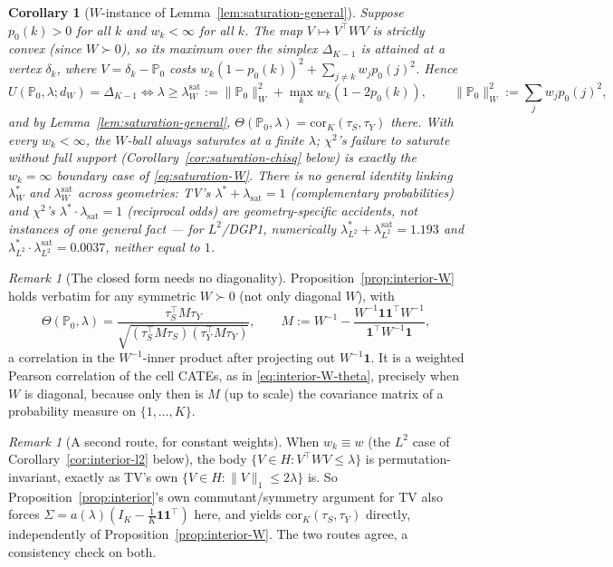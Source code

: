 \documentclass[11pt]{article}
\theoremstyle{plain}
\newtheorem{corollary}[theorem]{Corollary}
\theoremstyle{definition}
\theoremstyle{remark}
\newtheorem{remark}[theorem]{Remark}
\newcommand{\PP}{\mathbb{P}}
\newcommand{\Corr}{\mathrm{cor}}
\begin{document}
\begin{corollary}[$W$-instance of Lemma~\ref{lem:saturation-general}]\label{cor:saturation-W}
Suppose $p_0(k)>0$ for all $k$ and $w_k<\infty$ for all $k$. The map $V\mapsto V^\top WV$
is strictly convex (since $W\succ0$), so its maximum over the simplex $\Delta_{K-1}$ is
attained at a vertex $\delta_k$, where $V=\delta_k-\PP_0$ costs
$w_k(1-p_0(k))^2+\sum_{j\ne k}w_jp_0(j)^2$. Hence
\begin{equation}\label{eq:saturation-W}
    U(\PP_0,\lambda;d_W)=\Delta_{K-1}
    \iff
    \lambda\ge\lambda^{\mathrm{sat}}_W:=\|\PP_0\|_W^2+\max_kw_k(1-2p_0(k)),
    \qquad\|\PP_0\|_W^2:=\sum_jw_jp_0(j)^2,
\end{equation}
and by Lemma~\ref{lem:saturation-general}, $\Theta(\PP_0,\lambda)=\Corr_K(\tau_S,\tau_Y)$
there. With every $w_k<\infty$, the $W$-ball always saturates at a finite $\lambda$;
$\chi^2$'s failure to saturate without full support (Corollary~\ref{cor:saturation-chisq}
below) is exactly the $w_k=\infty$ boundary case of \eqref{eq:saturation-W}. There is no
general identity linking $\lambda^*_W$ and $\lambda^{\mathrm{sat}}_W$ across geometries:
TV's $\lambda^*+\lambda_{\mathrm{sat}}=1$ (complementary probabilities) and $\chi^2$'s
$\lambda^*\cdot\lambda_{\mathrm{sat}}=1$ (reciprocal odds) are geometry-specific
accidents, not instances of one general fact --- for $L^2$/DGP1, numerically
$\lambda^*_{L^2}+\lambda^{\mathrm{sat}}_{L^2}=1.193$ and
$\lambda^*_{L^2}\cdot\lambda^{\mathrm{sat}}_{L^2}=0.0037$, neither equal to $1$.
\end{corollary}

\begin{remark}[The closed form needs no diagonality]\label{rem:W-general-form}
Proposition~\ref{prop:interior-W} holds verbatim for any symmetric $W\succ0$ (not only
diagonal $W$), with
\[
    \Theta(\PP_0,\lambda)=\frac{\tau_S^\top M\tau_Y}{\sqrt{(\tau_S^\top M\tau_S)(\tau_Y^\top M\tau_Y)}},
    \qquad M:=W^{-1}-\frac{W^{-1}\mathbf1\mathbf1^\top W^{-1}}{\mathbf1^\top W^{-1}\mathbf1},
\]
a correlation in the $W^{-1}$-inner product after projecting out $W^{-1}\mathbf1$. It is
a weighted Pearson correlation of the cell CATEs, as in \eqref{eq:interior-W-theta},
precisely when $W$ is diagonal, because only then is $M$ (up to scale) the covariance
matrix of a probability measure on $\{1,\dots,K\}$.
\end{remark}

\begin{remark}[A second route, for constant weights]\label{rem:l2-tv-symmetry}
When $w_k\equiv w$ (the $L^2$ case of Corollary~\ref{cor:interior-l2} below), the body
$\{V\in H:V^\top WV\le\lambda\}$ is permutation-invariant, exactly as TV's own
$\{V\in H:\|V\|_1\le2\lambda\}$ is. So Proposition~\ref{prop:interior}'s own
commutant/symmetry argument for TV also forces
$\Sigma=a(\lambda)(I_K-\tfrac1K\mathbf1\mathbf1^\top)$ here, and yields
$\Corr_K(\tau_S,\tau_Y)$ directly, independently of Proposition~\ref{prop:interior-W}.
The two routes agree, a consistency check on both.
\end{remark}
\end{document}
